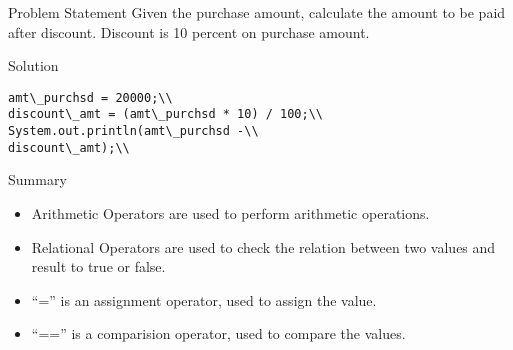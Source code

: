 \documentclass[aspectratio=169,14pt,usenames,dvipsnames]{beamer}
\begin{document}
\begin{frame}{Problem Statement}
Given the purchase amount, calculate the
amount to be paid after discount. Discount is
10 percent on purchase amount.
\end{frame}

\begin{frame}{Solution}
\begin{lstlisting}
amt\_purchsd = 20000;\\
discount\_amt = (amt\_purchsd * 10) / 100;\\
System.out.println(amt\_purchsd -\\
discount\_amt);\\
\end{lstlisting}
\end{frame}

\begin{frame}{Summary}
\begin{itemize}
    \item Arithmetic Operators are used to perform
arithmetic operations.
\item Relational Operators are used to check the
relation between two values and result to
true or false.
\item “=” is an assignment operator, used to
assign the value.
\item “==” is a comparision operator, used to
compare the values.
\end{itemize}
\end{frame}
\end{document}
